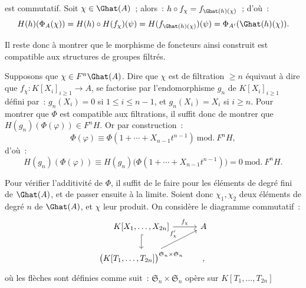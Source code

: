 est
commutatif. Soit \(\chi\in\Ghat(A)\)~; alors~: \(h\circ f_\chi=f_{\Ghat(h)(\chi)}\)~; d'où~:
\[
  H(h)(\Phi_A(\chi))=H(h)\circ H(f_\chi)(\psi)
  =H(f_{\Ghat(h)(\chi)})(\psi)=\Phi_{A'}(\Ghat(h)(\chi)).
\]

Il reste donc à montrer que le morphisme de foncteurs ainsi construit est compatible aux structures de groupes filtrés.

Supposons que \(\chi\in F^n\Ghat(A)\). Dire que \(\chi\) est de filtration \(\geq n\) équivaut à dire que \(f_\chi:K[X_i]_{i\geq 1}\to A\), se factorise par l'endomorphisme \(g_n\) de \(K[X_i]_{i\geq 1}\) défini par~: \(g_n(X_i)=0\) si \(1\leq i\leq n-1\), et \(g_n(X_i)=X_i\) si \(i\geq n\).
Pour montrer que \(\Phi\) est compatible aux filtrations, il suffit donc de montrer que \(H(g_n)(\Phi(\varphi))\in F^nH\). Or par construction~:
\[
  \Phi(\varphi)\equiv \Phi(1+\cdots+X_{n-1}t^{n-1})\ \mathrm{mod.}\ F^nH,
\]
d'où~:
\[
  H(g_n)(\Phi(\varphi))
  \equiv H(g_n)\bigl(\Phi(1+\cdots+X_{n-1}t^{n-1})\bigr)
  =0\ \mathrm{mod.}\ F^nH.
\]

Pour vérifier l'additivité de \(\Phi\), il suffit de le faire pour les éléments de degré fini de \(\Ghat(A)\), et de passer ensuite à la limite. Soient donc \(\chi_1,\chi_2\) deux éléments de degré \(n\) de \(\Ghat(A)\), et \(\chi\) leur produit. On considère le diagramme commutatif~:
\[
\begin{tikzcd}[column sep=tiny]
K[X_1,\ldots,X_{2n}] \arrow[rr,"f_\chi"] \arrow[d,hook] && A\\
\bigl(K[T_1,\ldots,T_{2n}]\bigr)^{\mathfrak S_n\times\mathfrak S_n}
\arrow[urr,"f'_\chi"] && ,
\end{tikzcd}
\]
où les flèches sont définies comme suit~: \(\mathfrak S_n\times\mathfrak S_n\) opère sur \(K[T_1,\ldots,T_{2n}]\) 
